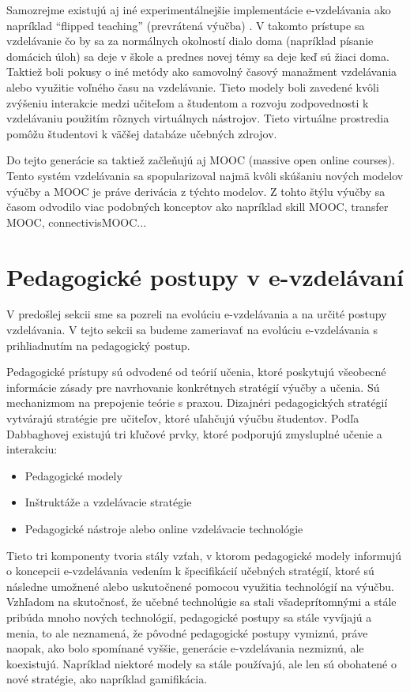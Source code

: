 \documentclass[10pt,slovak,a4paper]{article}
\begin{document}
	Samozrejme existujú aj iné experimentálnejšie implementácie e-vzdelávania ako napríklad “flipped teaching” (prevrátená výučba) \cite{baker}\cite{lage}.
	V takomto prístupe sa vzdelávanie čo by sa za normálnych okolností dialo doma (napríklad písanie domácich úloh) sa deje v škole a prednes novej témy sa deje keď sú žiaci doma. Taktiež boli pokusy o iné metódy ako samovolný časový manažment vzdelávania alebo využitie voľného času na vzdelávanie. Tieto modely boli zavedené kvôli zvýšeniu interakcie medzi učiteľom a študentom a rozvoju zodpovednosti k vzdelávaniu použitím rôznych virtuálnych nástrojov. Tieto virtuálne prostredia pomôžu študentovi k väčšej databáze učebných zdrojov.

	Do tejto generácie sa taktiež začleňujú aj MOOC (massive open online courses). Tento systém vzdelávania sa spopularizoval najmä kvôli skúšaniu nových modelov výučby a MOOC je práve derivácia z týchto modelov. Z tohto štýlu výučby sa časom odvodilo viac podobných konceptov ako napríklad skill MOOC, transfer MOOC, connectivisMOOC...
	\cite{main}
\section{Pedagogické postupy v e-vzdelávaní} \label{pedagogicalApproaches}
	V predošlej sekcii sme sa pozreli na evolúciu e-vzdelávania a na určité postupy vzdelávania. V tejto sekcii sa budeme zameriavať na evolúciu e-vzdelávania s prihliadnutím na pedagogický postup.

	Pedagogické prístupy sú odvodené od teórií učenia, ktoré poskytujú všeobecné informácie
zásady pre navrhovanie konkrétnych stratégií výučby a učenia. Sú mechanizmom na prepojenie teórie s praxou. Dizajnéri pedagogických stratégií vytvárajú stratégie pre učiteľov, ktoré uľahčujú výučbu študentov. Podľa Dabbaghovej existujú tri kľučové prvky, ktoré podporujú zmysluplné učenie a interakciu\cite{dabbagh}:
	\begin{itemize}
		\item Pedagogické modely
		\item Inštruktáže a vzdelávacie stratégie
		\item Pedagogické nástroje alebo online vzdelávacie technológie
	\end{itemize}
	Tieto tri komponenty tvoria stály vzťah, v ktorom pedagogické modely informujú o koncepcii e-vzdelávania vedením k špecifikácií učebných stratégií, ktoré sú následne umožnené alebo uskutočnené pomocou využitia technológií na výučbu. Vzhľadom na skutočnosť, že učebné technolúgie sa stali všadeprítomnými a stále pribúda mnoho nových technológií, pedagogické postupy sa stále vyvíjajú a menia, to ale neznamená, že pôvodné pedagogické postupy vymiznú, práve naopak, ako bolo spomínané vyššie, generácie e-vzdelávania nezmiznú, ale koexistujú. Napríklad niektoré modely sa stále používajú, ale len sú obohatené o nové stratégie, ako napríklad gamifikácia. 
	\cite{main}
\end{document}
